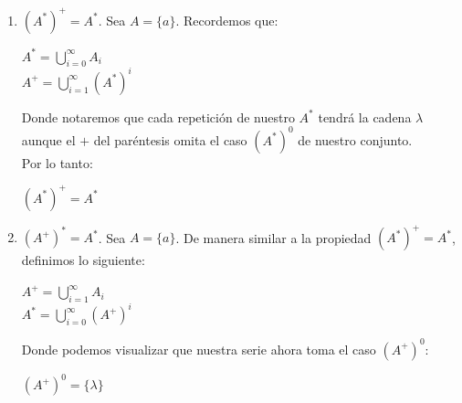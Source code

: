 \begin{enumerate}
        Siendo que:
        \begin{center}
            $A^+ = \{a,aa,aaa,aaaa,\ldots\}$
        \end{center}
        
        Podemos definir que:
        \begin{center}
            $x,y \in A^*,$ donde $x$ y $y$ son cadenas no vacías\\
            $\therefore x \in A^* - \{\lambda\}$; $y \in A^* - \{\lambda\}$\\
            $xy \in A^* - \{\lambda\}$\\
            $\therefore xy \in A^+$
        \end{center}
        
        Por lo tanto:
        \begin{center}
            $\boxed{A^+A^+ \subseteq A^+}$
        \end{center}
    \item $(A^*)^+ = A^*$.
        \subitem Sea $A = \{a\}$. Recordemos que:
        \begin{center}
            $A^* = \bigcup_{i=0}^{\infty}A_i$\\
            $A^+ = \bigcup_{i=1}^{\infty}(A^*)^i$
        \end{center}
        
        Donde notaremos que cada repetición de nuestro $A^*$ tendrá la cadena $\lambda$ aunque el $+$ del paréntesis omita el caso $(A^*)^0$ de nuestro conjunto.\\
        
        Por lo tanto:
        \begin{center}
            $\boxed{(A^*)^+ = A^*}$
        \end{center}
    \newpage
    \item $(A^+)^* = A^*$.
        \subitem Sea $A = \{a\}$. De manera similar a la propiedad $(A^*)^+ = A^*$, definimos lo siguiente:
        
        \begin{center}
            $A^+ = \bigcup_{i=1}^{\infty}A_i$\\
            $A^* = \bigcup_{i=0}^{\infty}(A^+)^i$
        \end{center}
        
        Donde podemos visualizar que nuestra serie ahora toma el caso $(A^+)^0$:
        \begin{center}
            $(A^+)^0 = \{\lambda\}$
        \end{center}
        

\end{enumerate}
